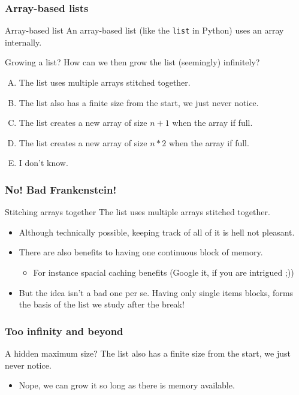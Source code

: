 \begin{frame}
	\frametitle{Array-based lists}
	\begin{block}{Array-based list}
		An array-based list (like the \texttt{list} in Python) uses an array internally.
	\end{block}
	\begin{block}{Growing a list?}
		How can we then grow the list (seemingly) infinitely?
		\begin{enumerate}[A.]
			\item The list uses multiple arrays stitched together.
			\item The list also has a finite size from the start, we just never notice.
			\item The list creates a new array of size $n+1$ when the array if full.
			\item The list creates a new array of size $n*2$ when the array if full.
			\item I don't know.
		\end{enumerate}
	\end{block}
\end{frame}

\begin{frame}
	\frametitle{No! Bad Frankenstein!}
	\begin{block}{Stitching arrays together}
		The list uses multiple arrays stitched together.
		\begin{itemize}
			\item Although technically possible, keeping track of all of it is hell not pleasant.
			\item There are also benefits to having one continuous block of memory.
				\begin{itemize}
					\item For instance spacial caching benefits (Google it, if you are intrigued ;))
				\end{itemize}
				\pause
			\item But the idea isn't a bad one per se. Having only single items blocks, forms the basis of the list we study
				after the break!
		\end{itemize}
	\end{block}	
\end{frame}

\begin{frame}
	\frametitle{Too infinity and beyond}
	\begin{block}{A hidden maximum size?}
		The list also has a finite size from the start, we just never notice.
		\begin{itemize}
			\item Nope, we can grow it so long as there is memory available.
		\end{itemize}
	\end{block}	
\end{frame}

